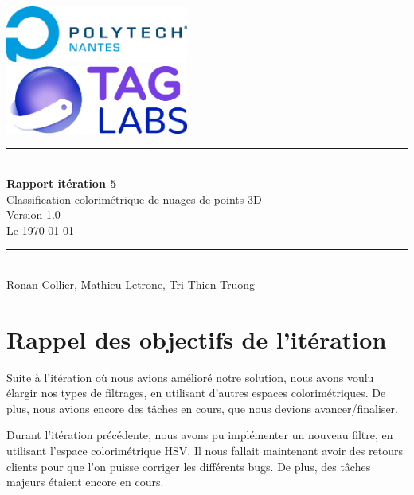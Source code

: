 \documentclass[12pt,titlepage,french]{article}
\begin{document}

\begin{titlepage}
\newcommand{\HRule}{\rule{\linewidth}{0.5mm}}
\center

  \includegraphics[width=0.45\textwidth]{../../ressources/img_logos/logo_polytech.png}\\[1cm]

  \includegraphics[width=0.45\textwidth]{../../ressources/img_logos/logo_taglabs.png}


\HRule \\[0.4cm]
{ \huge \bfseries Rapport itération 5\\[0.15cm] }
Classification colorimétrique de nuages de points 3D\\
Version 1.0\\
Le \today \\
\HRule \\[1.5cm]
Ronan Collier,
Mathieu Letrone,
Tri-Thien Truong
\\[1cm]
\end{titlepage}

\tableofcontents %
\newpage
\listoffigures  %
\newpage

\section{Rappel des objectifs de l'itération}
Suite à l'itération où nous avions amélioré notre solution, nous avons voulu élargir nos types de filtrages, en utilisant d'autres espaces colorimétriques. De plus, nous avions encore des tâches en cours, que nous devions avancer/finaliser.

Durant l'itération précédente, nous avons pu implémenter un nouveau filtre, en utilisant l'espace colorimétrique HSV. Il nous fallait maintenant avoir des retours clients pour que l'on puisse corriger les différents bugs. De plus, des tâches majeurs étaient encore en cours.
\end{document}
